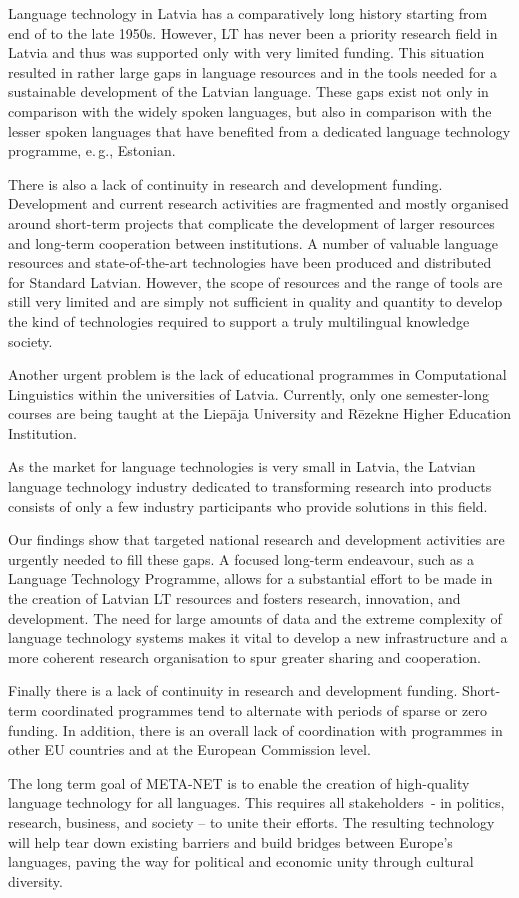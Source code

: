 \begin{multicols}{2}
Language technology in Latvia has a comparatively long history starting from end of to the late 1950s.
However, LT has never been a priority research field in Latvia and thus was supported only with very limited funding.
This situation resulted in rather large gaps in language resources and in the tools needed for a sustainable development of the Latvian language.
These gaps exist not only in comparison with the widely spoken languages, but also in comparison with the lesser spoken languages that have benefited from a dedicated language technology programme, e.\,g., Estonian.

There is also a lack of continuity in research and development funding.
Development and current research activities are fragmented and mostly organised around short-term projects that complicate the development of larger resources and long-term cooperation between institutions.
A number of valuable language resources and state-of-the-art technologies have been produced and distributed for Standard Latvian.
However, the scope of resources and the range of tools are still very limited and are simply not sufficient in quality and quantity to develop the kind of technologies required to support a truly multilingual knowledge society. 

Another urgent problem is the lack of educational programmes in Computational Linguistics within the universities of Latvia.
Currently, only one semester-long courses are being taught at the Liepāja University and Rēzekne Higher Education Institution.

As the market for language technologies is very small in Latvia, the Latvian language technology industry dedicated to transforming research into products consists of only a few industry participants who provide solutions in this field. 

Our findings show that targeted national research and development activities are urgently needed to fill these gaps.
A focused long-term endeavour, such as a Language Technology Programme, allows for a substantial effort to be made in the creation of Latvian LT resources and fosters research, innovation, and development.
The need for large amounts of data and the extreme complexity of language technology systems makes it vital to develop a new infrastructure and a more coherent research organisation to spur greater sharing and cooperation.

Finally there is a lack of continuity in research and development funding.
Short-term coordinated programmes tend to alternate with periods of sparse or zero funding.
In addition, there is an overall lack of coordination with programmes in other EU countries and at the European Commission level.

The long term goal of META-NET is to enable the creation of high-quality language technology for all languages.
This requires all stakeholders~- in politics, research, business, and society -- to unite their efforts.
The resulting technology will help tear down existing barriers and build bridges between Europe's languages, paving the way for political and economic unity through cultural diversity.

\end{multicols}
\clearpage

